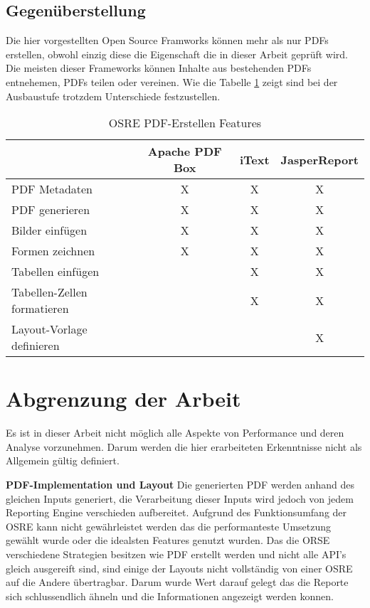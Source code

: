 \documentclass[main.tex]{subfiles}
\begin{document}
\subsection{Gegenüberstellung}

Die hier vorgestellten Open Source Framworks können mehr als nur PDFs erstellen, obwohl einzig diese die Eigenschaft die in dieser Arbeit geprüft wird. Die meisten dieser Frameworks können Inhalte aus bestehenden PDFs entnehemen, PDFs teilen oder vereinen. 
Wie die Tabelle \ref{table:featuresOSRE} zeigt sind bei der Ausbaustufe trotzdem Unterschiede festzustellen. 


\begin{table}[h]
\centering

\begin{tabular}{lccc}
               & Apache PDF Box & iText  & JasperReport \\ \hline
PDF Metadaten           &         X      &   X    &     X        \\
PDF generieren   &         X      &   X    &     X        \\
Bilder einfügen         &  X             &   X    &     X        \\
Formen zeichnen         &  X             &   X    &     X        \\
Tabellen einfügen                &                &   X    &     X        \\
Tabellen-Zellen formatieren      &                &   X    &     X        \\
Layout-Vorlage definieren         &                &        &     X        \\
\end{tabular}
\caption{OSRE PDF-Erstellen Features}
\label{table:featuresOSRE}
\end{table}


\section{ Abgrenzung der Arbeit}

Es ist in dieser Arbeit nicht möglich alle Aspekte von Performance und deren Analyse vorzunehmen. Darum werden die hier erarbeiteten Erkenntnisse nicht als Allgemein gültig definiert. 

\textbf{PDF-Implementation und Layout} \newline
Die generierten PDF werden anhand des gleichen Inputs generiert, die Verarbeitung dieser Inputs wird jedoch von jedem Reporting Engine verschieden aufbereitet. Aufgrund des Funktionsumfang der OSRE kann nicht gewährleistet werden das die performanteste Umsetzung gewählt wurde oder die idealsten Features genutzt wurden. Das die ORSE verschiedene Strategien besitzen wie PDF erstellt werden und nicht alle API's gleich ausgereift sind, sind einige der Layouts nicht vollständig von einer OSRE auf die Andere übertragbar. Darum wurde Wert darauf gelegt das die Reporte sich schlussendlich ähneln und die Informationen angezeigt werden konnen. 
\end{document}
